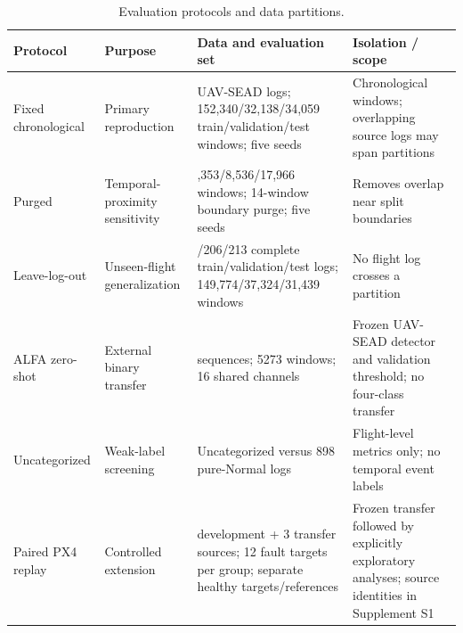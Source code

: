 \begin{table}[H]
\caption{Evaluation protocols and data partitions.}
\label{tab:protocol}
\centering
\footnotesize
\renewcommand{\arraystretch}{1.14}
\begin{tabularx}{\textwidth}{@{}>{\RaggedRight\arraybackslash}p{2.15cm} >{\RaggedRight\arraybackslash}p{2.85cm} >{\RaggedRight\arraybackslash}p{5.05cm} >{\RaggedRight\arraybackslash}X@{}}
\toprule
\textbf{Protocol} & \textbf{Purpose} & \textbf{Data and evaluation set} & \textbf{Isolation / scope}\\
\midrule
Fixed chronological & Primary reproduction & 1389 UAV-SEAD logs; 152,340/32,138/34,059 train/validation/test windows; five seeds & Chronological windows; overlapping source logs may span partitions\\
Purged & Temporal-proximity sensitivity & 133,353/8,536/17,966 windows; 14-window boundary purge; five seeds & Removes overlap near split boundaries\\
Leave-log-out & Unseen-flight generalization & 970/206/213 complete train/validation/test logs; 149,774/37,324/31,439 windows & No flight log crosses a partition\\
ALFA zero-shot & External binary transfer & 46 sequences; 5273 windows; 16 shared channels & Frozen UAV-SEAD detector and validation threshold; no four-class transfer\\
Uncategorized & Weak-label screening & 139 Uncategorized versus 898 pure-Normal logs & Flight-level metrics only; no temporal event labels\\
Paired PX4 replay & Controlled extension & 3 development + 3 transfer sources; 12 fault targets per group; separate healthy targets/references & Frozen transfer followed by explicitly exploratory analyses; source identities in Supplement S1\\
\bottomrule
\end{tabularx}
\par\vspace{2pt}{\scriptsize All UAV-SEAD protocols use 96-sample windows, stride 8, horizon 12, 87 channels, and 1566 derived features. Sampling intervals use 1000 flight- or sequence-cluster bootstrap repetitions. Corrected replay counts are descriptive; source-flight dependence is retained. Frozen model configurations and per-run records are described in the Data Availability Statement.}
\end{table}
